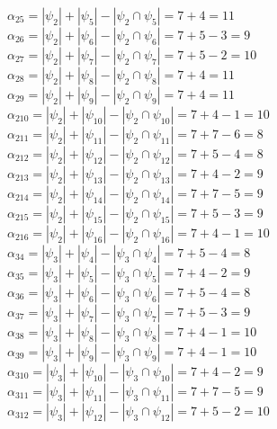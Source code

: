 \documentclass[12pt,a4paper]{report}
\begin{document}
$\alpha_{25} = |\psi_{2}| + |\psi_{5}| - |\psi_{2} \cap \psi_{5}| = 7 + 4 = 11$ \\
$\alpha_{26} = |\psi_{2}| + |\psi_{6}| - |\psi_{2} \cap \psi_{6}| = 7 + 5 - 3 = 9$ \\
$\alpha_{27} = |\psi_{2}| + |\psi_{7}| - |\psi_{2} \cap \psi_{7}| = 7 + 5 - 2 = 10$ \\
$\alpha_{28} = |\psi_{2}| + |\psi_{8}| - |\psi_{2} \cap \psi_{8}| = 7 + 4 = 11$ \\
$\alpha_{29} = |\psi_{2}| + |\psi_{9}| - |\psi_{2} \cap \psi_{9}| = 7 + 4 = 11$ \\
$\alpha_{210} = |\psi_{2}| + |\psi_{10}| - |\psi_{2} \cap \psi_{10}| = 7 + 4 - 1 = 10$ \\
$\alpha_{211} = |\psi_{2}| + |\psi_{11}| - |\psi_{2} \cap \psi_{11}| = 7 + 7 - 6 = 8$ \\
$\alpha_{212} = |\psi_{2}| + |\psi_{12}| - |\psi_{2} \cap \psi_{12}| = 7 + 5 - 4 = 8$ \\
$\alpha_{213} = |\psi_{2}| + |\psi_{13}| - |\psi_{2} \cap \psi_{13}| = 7 + 4 - 2 = 9$ \\
$\alpha_{214} = |\psi_{2}| + |\psi_{14}| - |\psi_{2} \cap \psi_{14}| = 7 + 7 - 5 = 9$ \\
$\alpha_{215} = |\psi_{2}| + |\psi_{15}| - |\psi_{2} \cap \psi_{15}| = 7 + 5 - 3 = 9$ \\
$\alpha_{216} = |\psi_{2}| + |\psi_{16}| - |\psi_{2} \cap \psi_{16}| = 7 + 4 - 1 = 10$ \\
$\alpha_{34} = |\psi_{3}| + |\psi_{4}| - |\psi_{3} \cap \psi_{4}| = 7 + 5 - 4 = 8$ \\
$\alpha_{35} = |\psi_{3}| + |\psi_{5}| - |\psi_{3} \cap \psi_{5}| = 7 + 4 - 2 = 9$ \\
$\alpha_{36} = |\psi_{3}| + |\psi_{6}| - |\psi_{3} \cap \psi_{6}| = 7 + 5 - 4 = 8$ \\
$\alpha_{37} = |\psi_{3}| + |\psi_{7}| - |\psi_{3} \cap \psi_{7}| = 7 + 5 - 3 = 9$ \\
$\alpha_{38} = |\psi_{3}| + |\psi_{8}| - |\psi_{3} \cap \psi_{8}| = 7 + 4 - 1 = 10$ \\
$\alpha_{39} = |\psi_{3}| + |\psi_{9}| - |\psi_{3} \cap \psi_{9}| = 7 + 4 - 1 = 10$ \\
$\alpha_{310} = |\psi_{3}| + |\psi_{10}| - |\psi_{3} \cap \psi_{10}| = 7 + 4 - 2 = 9$ \\
$\alpha_{311} = |\psi_{3}| + |\psi_{11}| - |\psi_{3} \cap \psi_{11}| = 7 + 7 - 5 = 9$ \\
$\alpha_{312} = |\psi_{3}| + |\psi_{12}| - |\psi_{3} \cap \psi_{12}| = 7 + 5 - 2 = 10$ \\
\end{document}
